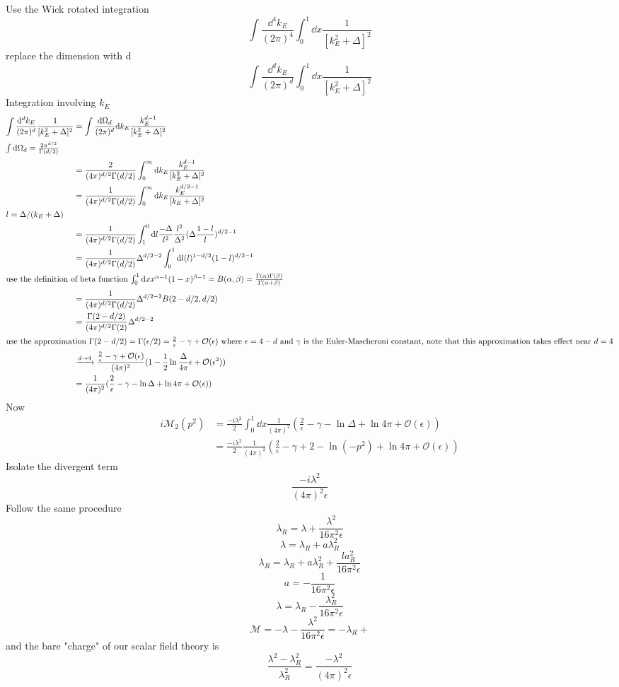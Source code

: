 \documentclass{article}
\newcommand{\g}{\gamma}
\renewcommand{\a}{\alpha}
\renewcommand{\b}{\beta}
\newcommand{\la}{\lambda}
\renewcommand{\G}{\Gamma}
\begin{document}
\begin{enumerate}[(i)]
  Use the Wick rotated integration
  $$\int\frac{\dd^4k_E}{(2\pi)^4}\int^1_0\dd x\frac{1}{[k_E^2+\Delta]^2}$$
  replace the dimension with d
  $$\int\frac{\dd^dk_E}{(2\pi)^d}\int^1_0\dd x\frac{1}{[k_E^2+\Delta]^2}$$
  Integration involving $k_E$
  \begin{align*}
    \int\frac{\dd^dk_E}{(2\pi)^d}\frac{1}{[k_E^2+\Delta]^2}&=\int\frac{\dd\Omega_d}{(2\pi)^d}\dd k_E\frac{k_E^{d-1}}{[k_E^2+\Delta]^2}\\\intertext{$\int\dd\Omega_d=\frac{2\pi^{d/2}}{\Gamma(d/2)}$}
    &=\frac{2}{(4\pi)^{d/2}\Gamma(d/2)}\int_0^{\infty}\dd k_E\frac{k_E^{d-1}}{[k_E^2+\Delta]^2}\\
    &=\frac{1}{(4\pi)^{d/2}\Gamma(d/2)}\int_0^{\infty}\dd k_E\frac{k_E^{d/2-1}}{[k_E+\Delta]^2}\\\intertext{$l=\Delta/(k_E+\Delta)$}
    &=\frac{1}{(4\pi)^{d/2}\Gamma(d/2)}\int_{1}^{0}\dd l\frac{-\Delta}{l^2}\frac{l^2}{\Delta^2}(\Delta\frac{1-l}{l})^{d/2-1}\\
    &=\frac{1}{(4\pi)^{d/2}\Gamma(d/2)}\Delta^{d/2-2}\int_0^{1}\dd l(l)^{1-d/2}(1-l)^{d/2-1}\\\intertext{use the definition of beta function $\int_0^1\dd xx^{\alpha-1}(1-x)^{\beta-1}=B(\a,\b)=\frac{\Gamma(\a)\Gamma(\b)}{\G(\a+\b)}$}
    &=\frac{1}{(4\pi)^{d/2}\Gamma(d/2)}\Delta^{d/2-2}B(2-d/2,d/2)\\
    &=\frac{\G(2-d/2)}{(4\pi)^{d/2}\G(2)}\Delta^{d/2-2}\\\intertext{use the approximation $\G(2-d/2)=\G(\epsilon/2)=\frac{2}{\epsilon}-\g+\mathcal{O}(\epsilon)$ where $\epsilon=4-d$ and $\g$ is the Euler-Mascheroni constant, note that this approximation takes effect near $d=4$}
    &\xrightarrow{d\rightarrow4}\frac{\frac{2}{\epsilon}-\g+\mathcal{O}(\epsilon)}{(4\pi)^{2}}(1-\frac{1}{2}\ln{\frac{\Delta}{4\pi}}\epsilon+\mathcal{O}(\epsilon^2))\\
    &=\frac{1}{(4\pi)^{2}}(\frac{2}{\epsilon}-\g-\ln{\Delta}+\ln{4\pi}+\mathcal{O}(\epsilon))\\
  \end{align*}
  Now
  \begin{align*}
    i\mathcal{M}_2(p^2)&=\frac{-i\lambda^2}{2}\int_0^1\dd x\frac{1}{(4\pi)^{2}}(\frac{2}{\epsilon}-\g-\ln{\Delta}+\ln{4\pi}+\mathcal{O}(\epsilon))\\
    &=\frac{-i\lambda^2}{2}\frac{1}{(4\pi)^{2}}(\frac{2}{\epsilon}-\g+2-\ln{(-p^2)}+\ln{4\pi}+\mathcal{O}(\epsilon))
  \end{align*}
  Isolate the divergent term
  $$\frac{-i\lambda^2}{(4\pi)^{2}\epsilon}$$
  Follow the same procedure
  $$\la_R=\lambda+\frac{\la^2}{16\pi^2\epsilon}$$
  $$\la=\la_R+a\la_R^2$$
  $$\la_R=\la_R+a\la_R^2+\frac{la_R^2}{16\pi^2\epsilon}$$
  $$a=-\frac{1}{16\pi^2\epsilon}$$
  $$\la=\la_R-\frac{\la_R^2}{16\pi^2\epsilon}$$
  $$\mathcal{M}=-\la-\frac{\la^2}{16\pi^2\epsilon}=-\la_R+$$
  and the bare "charge" of our scalar field theory is
  $$\frac{\lambda^2-\lambda_R^2}{\lambda_R^2}=\frac{-\lambda^2}{(4\pi)^{2}\epsilon}$$

\end{enumerate}
\end{document}
